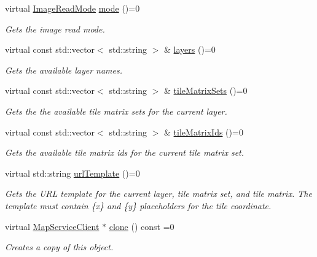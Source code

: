 \begin{DoxyCompactItemize}
virtual \hyperlink{group___imagery_module_ga1db94ae833853b71ed501bb1ea8c1c24}{Image\+Read\+Mode} \hyperlink{classdg_1_1deepcore_1_1imagery_1_1_map_service_client_ae727c872288e3a4219f80b6caa90ff3a}{mode} ()=0
\begin{DoxyCompactList}\small\item\em Gets the image read mode. \end{DoxyCompactList}\item 
virtual const std\+::vector$<$ std\+::string $>$ \& \hyperlink{group___imagery_module_ga51617c7aeaf00918210d64aaf5712d4e}{layers} ()=0
\begin{DoxyCompactList}\small\item\em Gets the available layer names. \end{DoxyCompactList}\item 
virtual const std\+::vector$<$ std\+::string $>$ \& \hyperlink{group___imagery_module_ga1cf271559e56836cf29176382c934a0c}{tile\+Matrix\+Sets} ()=0
\begin{DoxyCompactList}\small\item\em Gets the the available tile matrix sets for the current layer. \end{DoxyCompactList}\item 
virtual const std\+::vector$<$ std\+::string $>$ \& \hyperlink{group___imagery_module_ga2e5ad607fa13ac17e0fcb6b00af7d30e}{tile\+Matrix\+Ids} ()=0
\begin{DoxyCompactList}\small\item\em Gets the available tile matrix ids for the current tile matrix set. \end{DoxyCompactList}\item 
virtual std\+::string \hyperlink{group___imagery_module_gaafa4e8cc2a047f6467e227603ccf1a23}{url\+Template} ()=0
\begin{DoxyCompactList}\small\item\em Gets the U\+RL template for the current layer, tile matrix set, and tile matrix. The template must contain \{x\} and \{y\} placeholders for the tile coordinate. \end{DoxyCompactList}\item 
virtual \hyperlink{classdg_1_1deepcore_1_1imagery_1_1_map_service_client}{Map\+Service\+Client} $\ast$ \hyperlink{classdg_1_1deepcore_1_1imagery_1_1_map_service_client_a0010dc0a07c7ec55b7b3ea1d94b65c9d}{clone} () const =0
\begin{DoxyCompactList}\small\item\em Creates a copy of this object. \end{DoxyCompactList}\end{DoxyCompactItemize}
